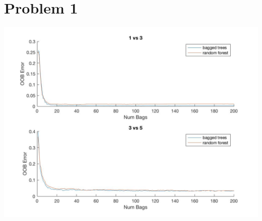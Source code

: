 \documentclass[12pt,letterpaper]{article}
\begin{document}
\section*{Problem 1}
\includegraphics[scale=0.4]{image.jpg} 
\end{document}
